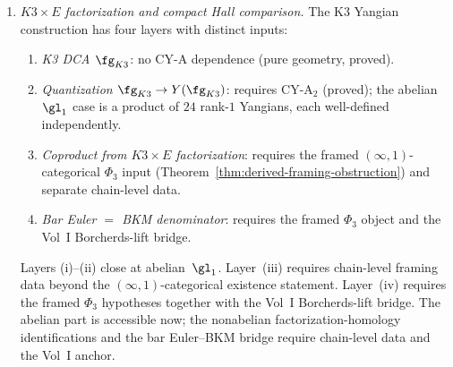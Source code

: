 \begin{remark}
\begin{enumerate}[label=\textbf{A\arabic*.}, leftmargin=2.5em]
\item \emph{\(K3 \times E\) factorization and compact Hall comparison.}
The K3 Yangian construction has four layers with distinct inputs:
\begin{enumerate}[label=(\roman*)]
\item \emph{K3 DCA $\fg_{K3}$}: no CY-A dependence (pure geometry, proved).
\item \emph{Quantization $\fg_{K3} \to Y(\fg_{K3})$}: requires CY-A$_2$
 (proved); the abelian $\gl_1$ case is a product of $24$ rank-$1$
 Yangians, each well-defined independently.
\item \emph{Coproduct from $K3 \times E$ factorization}: requires the
 framed \((\infty,1)\)-categorical $\Phi_3$ input
 \textup{(}Theorem~\ref{thm:derived-framing-obstruction}\textup{)} and
 separate chain-level data.
\item \emph{Bar Euler $=$ BKM denominator}: requires the framed
 $\Phi_3$ object and the Vol~I Borcherds-lift bridge.
\end{enumerate}
Layers (i)--(ii) close at abelian~$\gl_1$.
Layer~(iii) requires chain-level framing data beyond the
\((\infty,1)\)-categorical existence statement.
Layer~(iv) requires the framed $\Phi_3$ hypotheses together with the
Vol~I Borcherds-lift bridge.
The abelian part is accessible now; the nonabelian
factorization-homology identifications and the bar Euler--BKM bridge
require chain-level data and the Vol~I anchor.


\end{enumerate}
\end{remark}

